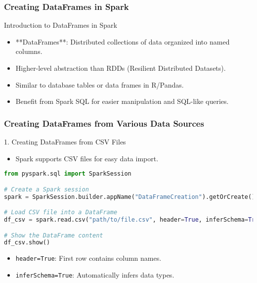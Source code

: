 \documentclass[aspectratio=169]{beamer}
\begin{document}
\begin{frame}
    \frametitle{Creating DataFrames in Spark}
    \begin{block}{Introduction to DataFrames in Spark}
        \begin{itemize}
            \item **DataFrames**: Distributed collections of data organized into named columns.
            \item Higher-level abstraction than RDDs (Resilient Distributed Datasets).
            \item Similar to database tables or data frames in R/Pandas.
            \item Benefit from Spark SQL for easier manipulation and SQL-like queries.
        \end{itemize}
    \end{block}
\end{frame}

\begin{frame}
    \frametitle{Creating DataFrames from Various Data Sources}
    \begin{block}{1. Creating DataFrames from CSV Files}
        \begin{itemize}
            \item Spark supports CSV files for easy data import.
        \end{itemize}
        \begin{lstlisting}[language=python]
from pyspark.sql import SparkSession

# Create a Spark session
spark = SparkSession.builder.appName("DataFrameCreation").getOrCreate()

# Load CSV file into a DataFrame
df_csv = spark.read.csv("path/to/file.csv", header=True, inferSchema=True)

# Show the DataFrame content
df_csv.show()
        \end{lstlisting}
        \begin{itemize}
            \item \texttt{header=True}: First row contains column names.
            \item \texttt{inferSchema=True}: Automatically infers data types.
        \end{itemize}
    \end{block}
\end{frame}
\end{document}
